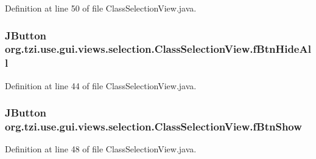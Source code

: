 Definition at line 50 of file Class\-Selection\-View.\-java.

\hypertarget{classorg_1_1tzi_1_1use_1_1gui_1_1views_1_1selection_1_1_class_selection_view_a290896a806e160ff1ef2984db6f2b62a}{
\subsubsection[{f\-Btn\-Hide\-All}]{\setlength{\rightskip}{0pt plus 5cm}J\-Button org.\-tzi.\-use.\-gui.\-views.\-selection.\-Class\-Selection\-View.\-f\-Btn\-Hide\-All\hspace{0.3cm}{\ttfamily [protected]}}}\label{classorg_1_1tzi_1_1use_1_1gui_1_1views_1_1selection_1_1_class_selection_view_a290896a806e160ff1ef2984db6f2b62a}


Definition at line 44 of file Class\-Selection\-View.\-java.

\hypertarget{classorg_1_1tzi_1_1use_1_1gui_1_1views_1_1selection_1_1_class_selection_view_ace593153c6ffee8b98c2f8d118fbd840}{
\subsubsection[{f\-Btn\-Show}]{\setlength{\rightskip}{0pt plus 5cm}J\-Button org.\-tzi.\-use.\-gui.\-views.\-selection.\-Class\-Selection\-View.\-f\-Btn\-Show\hspace{0.3cm}{\ttfamily [protected]}}}\label{classorg_1_1tzi_1_1use_1_1gui_1_1views_1_1selection_1_1_class_selection_view_ace593153c6ffee8b98c2f8d118fbd840}


Definition at line 48 of file Class\-Selection\-View.\-java.

